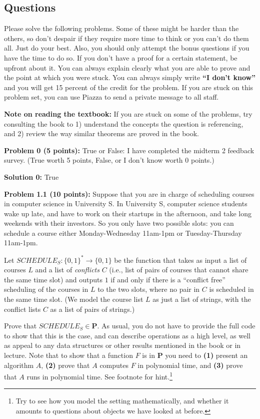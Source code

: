 \documentclass[11pt]{article}
\begin{document}
	\subsection*{Questions}\label{questions}
Please solve the following problems. Some of these might be harder than
the others, so don't despair if they require more time to think or you
can't do them all. Just do your best. Also, you should only attempt the
bonus questions if you have the time to do so. If you don't have a proof
for a certain statement, be upfront about it. You can always explain
clearly what you are able to prove and the point at which you were
stuck. 
You can always simply write
\textbf{``I don't know''} and you will get 15 percent of the credit for
the problem. If you are stuck on this problem set, you can use Piazza to
send a private message to all staff.


\textbf{Note on reading the textbook:} If you are stuck on some of the
problems, try consulting the book to 1) understand the concepts the
question is referencing, and 2) review the way similar theorems are
proved in the book.


\newcommand{\HALT}{\mathrm{HALT}}

\textbf{Problem 0 (5 points):} True or False: I have completed the midterm 2 feedback survey. (True worth 5 points, False, or I don't know worth 0 points.)

\textbf{Solution 0:} True

\newpage

\textbf{Problem 1.1 (10 points):} Suppose that you are in charge of
scheduling courses in computer science in University S. In University S,
computer science students wake up late, and have to work on their
startups in the afternoon, and take long weekends with their investors.
So you only have two possible slots: you can schedule a course either
Monday-Wednesday 11am-1pm or Tuesday-Thursday 11am-1pm.

Let \(SCHEDULE_S:\{0,1\}^* \rightarrow \{0,1\}\) be the function that
takes as input a list of courses \(L\) and a list of \emph{conflicts}
\(C\) (i.e., list of pairs of courses that cannot share the same time
slot) and outputs \(1\) if and only if there is a ``conflict free''
scheduling of the courses in \(L\) to the two slots, where no pair in
\(C\) is scheduled in the same time slot. (We model the course list
\(L\) as just a list of strings, with the conflict lists \(C\) as a list
of pairs of strings.)

Prove that \(SCHEDULE_S \in \mathbf{P}\). As usual, you do not have to
provide the full code to show that this is the case, and can describe
operations as a high level, as well as appeal to any data structures or
other results mentioned in the book or in lecture. Note that to show
that a function \(F\) is in \(\mathbf{P}\) you need to \textbf{(1)}
present an algorithm \(A\), 
\textbf{(2)} prove that \(A\) computes \(F\) in polynomial time, and
\textbf{(3)} prove that \(A\) runs in polynomial time. See footnote for hint.\footnote{Try to see how you model the setting
	mathematically, and whether it amounts to questions about objects we
	have looked at before.}
\end{document}
